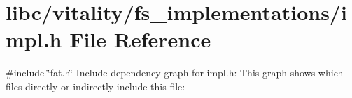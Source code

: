 \hypertarget{a00161}{}\section{libc/vitality/fs\+\_\+implementations/impl.h File Reference}
\label{a00161}
{\ttfamily \#include \char`\"{}fat.\+h\char`\"{}}\newline
Include dependency graph for impl.\+h\+:
This graph shows which files directly or indirectly include this file\+:
